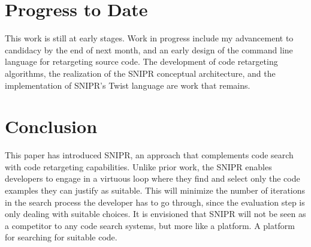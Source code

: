 \documentclass[conference]{IEEEtran}
\begin{document}
\section{Progress to Date}
\label{sec:progress}
This work is still at early stages. Work in progress include my advancement to candidacy by the end of next month, and an early design of the command line language for retargeting source code. The development of code retargeting algorithms, the realization of the \uppercase{SnipR} conceptual architecture, and the implementation of SNIPR's Twist language are work that remains.

\section{Conclusion}
\label{sec:conclude}
This paper has introduced \uppercase{SnipR}, an approach that complements code search with code retargeting capabilities. Unlike prior work, the \uppercase{SnipR} enables developers to engage in a virtuous loop where they find and select only the code examples they can justify as suitable. This will minimize the number of iterations in the search process the developer has to go through, since the evaluation step is only dealing with suitable choices. It is envisioned that \uppercase{SnipR} will not be seen as a competitor to any code search systems, but more like a platform. A platform for searching for suitable code.




%
	
\end{document}
